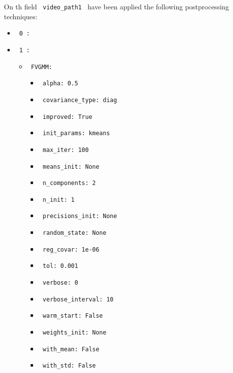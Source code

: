 \documentclass[11pt]{article}
\begin{document}
On th field \verb| video_path1 | have been applied the following postprocessing techniques:
\begin{itemize}
    \item
     \verb| 0 :|
     \begin{itemize}
           \end{itemize}
    \item
     \verb| 1 :|
     \begin{itemize}
             \item
            \verb| FVGMM: |

                   \begin{itemize}
                                    \item
                        \verb| alpha: 0.5 |
                                    \item
                        \verb| covariance_type: diag |
                                    \item
                        \verb| improved: True |
                                    \item
                        \verb| init_params: kmeans |
                                    \item
                        \verb| max_iter: 100 |
                                    \item
                        \verb| means_init: None |
                                    \item
                        \verb| n_components: 2 |
                                    \item
                        \verb| n_init: 1 |
                                    \item
                        \verb| precisions_init: None |
                                    \item
                        \verb| random_state: None |
                                    \item
                        \verb| reg_covar: 1e-06 |
                                    \item
                        \verb| tol: 0.001 |
                                    \item
                        \verb| verbose: 0 |
                                    \item
                        \verb| verbose_interval: 10 |
                                    \item
                        \verb| warm_start: False |
                                    \item
                        \verb| weights_init: None |
                                    \item
                        \verb| with_mean: False |
                                    \item
                        \verb| with_std: False |
                            \end{itemize}
       

\end{itemize}
\end{itemize}
\end{document}
